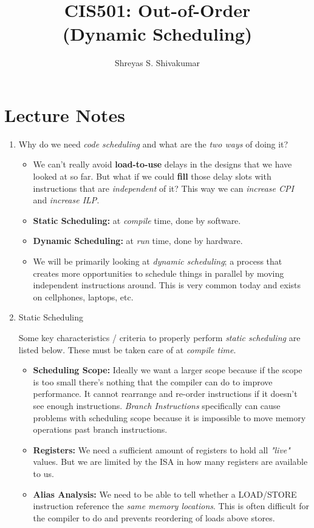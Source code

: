 \documentclass[12pt]{article}
\title{CIS501: Out-of-Order \\ (Dynamic Scheduling)}
\author[1]{Shreyas S. Shivakumar}
\newenvironment{QandA}{\begin{enumerate}[label=\bfseries\arabic*.]\bfseries}
                      {\end{enumerate}}
\newenvironment{answered}{\par\quad\normalfont}{}
\begin{document}
\maketitle

\section{Lecture Notes}

\begin{QandA}
\item Why do we need \textit{code scheduling} and what are the \textit{two ways} of doing it?
\begin{answered}
\vspace{-0.85cm}
\begin{itemize}
    \item We can't really avoid \textbf{load-to-use} delays in the designs that we have looked at so far. But what if we could \textbf{fill} those delay slots with instructions that are \textit{independent} of it? This way we can \textit{increase CPI} and \textit{increase ILP}. 
    \item \textbf{Static Scheduling:} at \textit{compile} time, done by software. 
    \item \textbf{Dynamic Scheduling:} at \textit{run} time, done by hardware.
    \item We will be primarily looking at \textit{dynamic scheduling}; a process that creates more opportunities to schedule things in parallel by moving independent instructions around. This is very common today and exists on cellphones, laptops, etc.
\end{itemize}
\end{answered}

\item Static Scheduling
\begin{answered}
Some key characteristics / criteria to properly perform \textit{static scheduling} are listed below. These must be taken care of at \textit{compile time}. 
\begin{itemize}
    \item \textbf{Scheduling Scope:} Ideally we want a larger scope because if the scope is too small there's nothing that the compiler can do to improve performance. It cannot rearrange and re-order instructions if it doesn't see enough instructions. \textit{Branch Instructions} specifically can cause problems with scheduling scope because it is impossible to move memory operations past branch instructions. 
    \item \textbf{Registers:} We need a sufficient amount of registers to hold all \textit{"live"} values. But we are limited by the ISA in how many registers are available to us. 
    \item \textbf{Alias Analysis:} We need to be able to tell whether a LOAD/STORE instruction reference the \textit{same memory locations}. This is often difficult for the compiler to do and prevents reordering of loads above stores. 
\end{itemize}


\end{answered}
\end{QandA}
\end{document}
